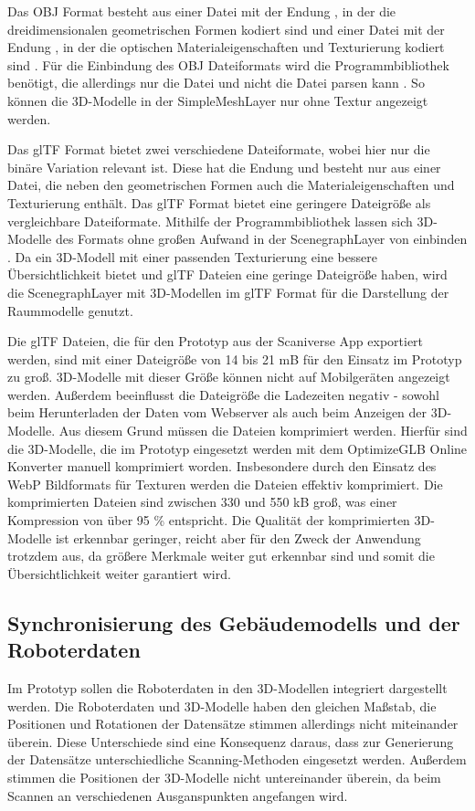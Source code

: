 Das \ac{OBJ} Format besteht aus einer Datei mit der Endung \obj{}, in der die dreidimensionalen geometrischen Formen kodiert sind \cite{OBJSpec} und einer Datei mit der Endung \mtl{}, in der die optischen Materialeigenschaften und Texturierung kodiert sind \cite{MTLSpec}. Für die Einbindung des \ac{OBJ} Dateiformats wird die \loadersgl{} Programmbibliothek benötigt, die allerdings nur die \obj{} Datei und nicht die \mtl{} Datei parsen kann \cite{OBJLoader}. So können die 3D-Modelle in der SimpleMeshLayer nur ohne Textur angezeigt werden.

Das \ac{glTF} Format bietet zwei verschiedene Dateiformate, wobei hier nur die binäre Variation relevant ist. Diese hat die Endung \glb{} und besteht nur aus einer Datei, die neben den geometrischen Formen auch die Materialeigenschaften und Texturierung enthält. Das \ac{glTF} Format bietet eine geringere Dateigröße als vergleichbare Dateiformate.\cite[Abschnitt 2]{glTFSpec} Mithilfe der \loadersgl{} Programmbibliothek lassen sich 3D-Modelle des Formats ohne großen Aufwand in der ScenegraphLayer von \deckgl{} einbinden \cite{DeckglScenegraphLayer}. Da ein 3D-Modell mit einer passenden Texturierung eine bessere Übersichtlichkeit bietet und \ac{glTF} Dateien eine geringe Dateigröße haben, wird die ScenegraphLayer mit 3D-Modellen im \ac{glTF} Format für die Darstellung der Raummodelle genutzt.

Die \ac{glTF} Dateien, die für den Prototyp aus der Scaniverse App exportiert werden, sind mit einer Dateigröße von 14 bis 21 \ac{mB} für den Einsatz im Prototyp zu groß. 3D-Modelle mit dieser Größe können nicht auf Mobilgeräten angezeigt werden. Außerdem beeinflusst die Dateigröße die Ladezeiten negativ - sowohl beim Herunterladen der Daten vom Webserver als auch beim Anzeigen der 3D-Modelle. Aus diesem Grund müssen die Dateien komprimiert werden. Hierfür sind die 3D-Modelle, die im Prototyp eingesetzt werden mit dem OptimizeGLB Online Konverter manuell komprimiert worden. Insbesondere durch den Einsatz des \ac{WebP} Bildformats für Texturen werden die Dateien effektiv komprimiert.\cite{OptimizeGLB} Die komprimierten Dateien sind zwischen 330 und 550 \ac{kB} groß, was einer Kompression von über 95 \% entspricht. Die Qualität der komprimierten 3D-Modelle ist erkennbar geringer, reicht aber für den Zweck der Anwendung trotzdem aus, da größere Merkmale weiter gut erkennbar sind und somit die Übersichtlichkeit weiter garantiert wird.

\subsection{Synchronisierung des Gebäudemodells und der Roboterdaten}
Im Prototyp sollen die Roboterdaten in den 3D-Modellen integriert dargestellt werden. Die Roboterdaten und 3D-Modelle haben den gleichen Maßstab, die Positionen und Rotationen der Datensätze stimmen allerdings nicht miteinander überein. Diese Unterschiede sind eine Konsequenz daraus, dass zur Generierung der Datensätze unterschiedliche Scanning-Methoden eingesetzt werden. Außerdem stimmen die Positionen der 3D-Modelle nicht untereinander überein, da beim Scannen an verschiedenen Ausganspunkten angefangen wird.

